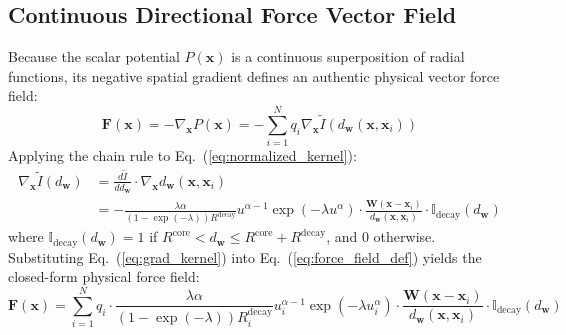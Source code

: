 \documentclass[times, review, 10pt]{elsarticle}
\begin{document}
\subsection{Continuous Directional Force Vector Field}
Because the scalar potential $P(\mathbf{x})$ is a continuous superposition of radial functions, its negative spatial gradient defines an authentic physical vector force field:
\begin{equation}
\mathbf{F}(\mathbf{x}) = -\nabla_{\mathbf{x}} P(\mathbf{x}) = -\sum_{i=1}^N q_i \nabla_{\mathbf{x}} \tilde{I}(d_{\mathbf{w}}(\mathbf{x}, \mathbf{x}_i))
\label{eq:force_field_def}
\end{equation}
Applying the chain rule to Eq.~(\ref{eq:normalized_kernel}):
\begin{align}
\nabla_{\mathbf{x}} \tilde{I}(d_{\mathbf{w}}) &= \frac{d\tilde{I}}{d d_{\mathbf{w}}} \cdot \nabla_{\mathbf{x}} d_{\mathbf{w}}(\mathbf{x}, \mathbf{x}_i) \\
&= -\frac{\lambda \alpha}{(1 - \exp(-\lambda)) R^{\mathrm{decay}}} u^{\alpha-1} \exp(-\lambda u^\alpha) \cdot \frac{\mathbf{W}(\mathbf{x} - \mathbf{x}_i)}{d_{\mathbf{w}}(\mathbf{x}, \mathbf{x}_i)} \cdot \mathbb{I}_{\text{decay}}(d_{\mathbf{w}})
\label{eq:grad_kernel}
\end{align}
where $\mathbb{I}_{\text{decay}}(d_{\mathbf{w}}) = 1$ if $R^{\mathrm{core}} < d_{\mathbf{w}} \le R^{\mathrm{core}} + R^{\mathrm{decay}}$, and $0$ otherwise. Substituting Eq.~(\ref{eq:grad_kernel}) into Eq.~(\ref{eq:force_field_def}) yields the closed-form physical force field:
\begin{equation}
\mathbf{F}(\mathbf{x}) = \sum_{i=1}^N q_i \cdot \frac{\lambda \alpha}{(1 - \exp(-\lambda)) R_i^{\mathrm{decay}}} u_i^{\alpha - 1} \exp(-\lambda u_i^\alpha) \cdot \frac{\mathbf{W}(\mathbf{x} - \mathbf{x}_i)}{d_{\mathbf{w}}(\mathbf{x}, \mathbf{x}_i)} \cdot \mathbb{I}_{\text{decay}}(d_{\mathbf{w}})
\label{eq:force_field}
\end{equation}
\end{document}

